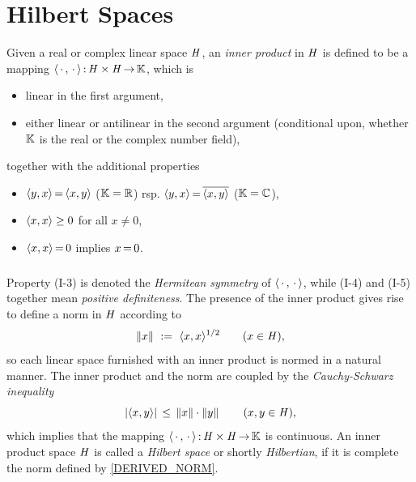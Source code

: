 \documentclass[11pt,twoside]{article}
\begin{document}
\section{Hilbert Spaces}                                                       %
Given a real or complex linear space $\mathit{H}$,
an \textit{inner product} in $\mathit{H}$ is defined to be a mapping
$\langle \,\cdot\,,\,\cdot\, \rangle{\,:\,} \mathit{H} \times \mathit{H} {\,\to\,} {\mathbb{K}}$,
which is

\begin{itemize}[leftmargin=35pt]
\item[(I-1)]
linear in the first argument,

\item[(I-2)]
either linear or antilinear in the second argument (conditional upon,
whether ${\mathbb{K}}$ is the real or the complex number field),
\end{itemize}
together with the additional properties

\begin{itemize}[leftmargin=35pt]
\item[(I-3)]
$\langle y,x \rangle {\,=\,}           \langle x,y \rangle$  (${\mathbb{K}}={\mathbb{R}}$) rsp.
$\langle y,x \rangle {\,=\,} \overline{\langle x,y \rangle}$ (${\mathbb{K}}={\mathbb{C}}$),
\item[(I-4)]
$\langle x,x \rangle \geq 0$ for all $x \neq 0$,
\item[(I-5)]
$\langle x,x \rangle {\,=\,} 0$ implies $x {\,=\,} 0$.
\end{itemize}

\subparagraph*{}
Property (I-3) is denoted the \textit{Hermitean symmetry}
of $\langle \,\cdot\,,\,\cdot\, \rangle$,
while (I-4) and (I-5) together mean \textit{positive definiteness}.
The presence of the inner product gives rise to define a norm in $\mathit{H}$
according to
\begin{equation}\label{DERIVED_NORM}
\left\lVert x \right\rVert \, \,:=\, \, \langle x,x \rangle ^{1/2} \quad \quad (x \in \mathit{H}),
\end{equation}
so each linear space furnished with an inner product is normed
in a natural manner.
The inner product and the norm are coupled by
the \textit{Cauchy-Schwarz} \textit{inequality}
\[
\abs{\scalar{x}{y}} \, \leq \,
\norm{x} \cdot \norm{y} \quad \quad (x,y \in \hilH),
\]
which implies that the mapping
$\langle \,\cdot\,,\,\cdot\, \rangle{\,:\,}\mathit{H} \times \mathit{H} {\,\to\,} {\mathbb{K}}$ is continuous.
An inner product space $\mathit{H}$ is called a \textit{Hilbert space}
or shortly \textit{Hilbertian},
if it is complete {\wrt} the norm defined by \eqref{DERIVED_NORM}.
\end{document}
